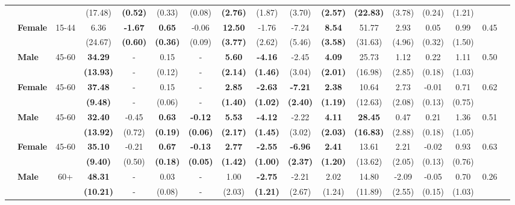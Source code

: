 \documentclass{article}
\begin{document}
\begin{table}[!htbp]
\begin{tabular}{@{\extracolsep{.05pt}}|clccccccccccccccc|}
&  & & (17.48) & \textbf{(0.52)} & (0.33) & (0.08) & \textbf{(2.76)} & (1.87) & (3.70) & \textbf{(2.57)} & \textbf{(22.83)} & (3.78) & (0.24) & (1.21) & & \\
& \textbf{Female} & 15-44  & 6.36 & \textbf{-1.67} & \textbf{0.65} & -0.06 & \textbf{12.50} & -1.76 & -7.24 & \textbf{8.54} & 51.77 & 2.93 & 0.05 & 0.99 & 0.45 & \\
&  &  & (24.67) & \textbf{(0.60)} & \textbf{(0.36)} & (0.09) & \textbf{(3.77)} & (2.62) & (5.46) & \textbf{(3.58)} & (31.63) & (4.96) & (0.32) & (1.50) & & \\
& \textbf{Male} & 45-60  & \textbf{34.29} & - & 0.15 & - & \textbf{5.60} & \textbf{-4.16} & -2.45 & \textbf{4.09} & 25.73 & 1.12 & 0.22 & 1.11 & 0.50 & \\
&  & & \textbf{(13.93)} & - & (0.12) & - & \textbf{(2.14)} & \textbf{(1.46)} & (3.04) & \textbf{(2.01)} & (16.98) & (2.85) & (0.18) & (1.03) & & \\
& \textbf{Female} & 45-60 & \textbf{37.48} & - & 0.15 & - & \textbf{2.85} & \textbf{-2.63} & \textbf{-7.21} & \textbf{2.38} & 10.64 & 2.73 & -0.01 & 0.71 & 0.62 & \\
&  & & \textbf{(9.48)} & - & (0.06) & - & \textbf{(1.40)} & \textbf{(1.02)} & \textbf{(2.40)} & \textbf{(1.19)} & (12.63) & (2.08) & (0.13) & (0.75) & & \\
& \textbf{Male} & 45-60 & \textbf{32.40} & -0.45 & \textbf{0.63} & \textbf{-0.12} & \textbf{5.53} & \textbf{-4.12} & -2.22 & \textbf{4.11} & \textbf{28.45} & 0.47 & 0.21 & 1.36 & 0.51 & \\
&  & & \textbf{(13.92)} & (0.72) & \textbf{(0.19)} & \textbf{(0.06)} & \textbf{(2.17)} & \textbf{(1.45)} & (3.02) & \textbf{(2.03)} & \textbf{(16.83)} & (2.88) & (0.18) & (1.05) & & \\
& \textbf{Female} & 45-60 & \textbf{35.10} & -0.21 & \textbf{0.67} & \textbf{-0.13} & \textbf{2.77} & \textbf{-2.55} & \textbf{-6.96} & \textbf{2.41} & 13.61 & 2.21 & -0.02 & 0.93 & 0.63 & \\
&  & & \textbf{(9.40)} & (0.50) & \textbf{(0.18)} & \textbf{(0.05)} & \textbf{(1.42)} & \textbf{(1.00)} & \textbf{(2.37)} & \textbf{(1.20)} & (13.62) & (2.05) & (0.13) & (0.76) & & \\
& \textbf{Male} & 60+ & \textbf{48.31} & - & 0.03 & - & 1.00 & \textbf{-2.75} & -2.21 & 2.02 & 14.80 & -2.09 & -0.05 & 0.70 & 0.26 & \\
&  & & \textbf{(10.21)} & - & (0.08) & - & (2.03) & \textbf{(1.21)} & (2.67) & (1.24) & (11.89) & (2.55) & (0.15) & (1.03) & & \\

\end{tabular}
\end{table}
\end{document}
